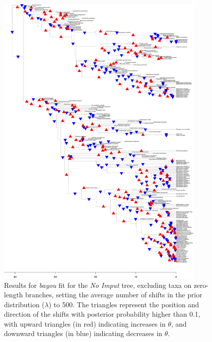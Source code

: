 \begin{figure}[H]
\includegraphics[width=0.9\textwidth]{img/plots-noimput-k500-1.pdf}
\caption{Results for \textit{bayou} fit for the \textit{No Imput} tree, excluding taxa on zero-length branches, setting the average number of shifts in the prior distribution ($\lambda$) to 500. The triangles represent the position and direction of the shifts with posterior probability higher than 0.1, with upward triangles (in red) indicating increases in $\theta$, and downward triangles (in blue) indicating decreases in $\theta$.}
\label{fig:noimput-k500-nzlb}
\end{figure}

